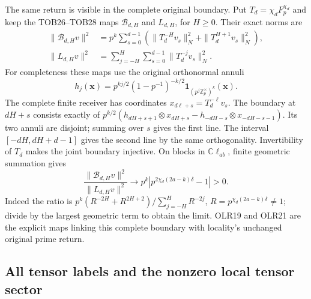 The same return is visible in the complete original boundary.
Put $T_d=\chi_dF_p^{\chi_d}$ and keep the TOB26--TOB28 maps
$\mathcal B_{d,H}$ and $L_{d,H}$, for $H\ge0$. Their exact norms are
\[
\begin{split}
\|\mathcal B_{d,H}v\|^2
&=p^k\sum_{s=0}^{d-1}
       (\|T_d^{-H}v_s\|_N^2+\|T_d^{H+1}v_s\|_N^2),\\
\|L_{d,H}v\|^2
&=\sum_{j=-H}^H\sum_{s=0}^{d-1}\|T_d^{-j}v_s\|_N^2.
\end{split}
\tag{OLR21}
\]
For completeness these maps use the original orthonormal annuli
\[
h_j(\mathbf x)=p^{kj/2}(1-p^{-1})^{-k/2}
\mathbf1_{(p^j\mathbb Z_p^\times)^k}(\mathbf x).
\]
The complete finite receiver has coordinates
$x_{d\ell+s}=T_d^{-\ell}v_s$.
The boundary at $dH+s$ consists exactly of
$p^{k/2}(h_{dH+s+1}\otimes x_{dH+s}
 -h_{-dH-s}\otimes x_{-dH-s-1})$.
Its two annuli are disjoint; summing over $s$ gives the first line.
The interval $[-dH,dH+d-1]$ gives the second line by the same
orthogonality. Invertibility of $T_d$ makes the joint boundary
injective. On blocks in $\mathbb C\ell_{ab}$, finite geometric
summation gives
\[
\frac{\|\mathcal B_{d,H}v\|^2}{\|L_{d,H}v\|^2}
\longrightarrow p^k\left|p^{2\chi_d(2a-k)\delta}-1\right|>0.
\tag{OLR22}
\]
Indeed the ratio is
$p^k(R^{-2H}+R^{2H+2})/\sum_{j=-H}^HR^{-2j}$,
$R=p^{\chi_d(2a-k)\delta}\ne1$; divide by the largest
geometric term to obtain the limit. OLR19 and OLR21 are the
explicit maps linking this complete boundary with locality's
unchanged original prime return.

\subsection{All tensor labels and the nonzero local tensor sector}

